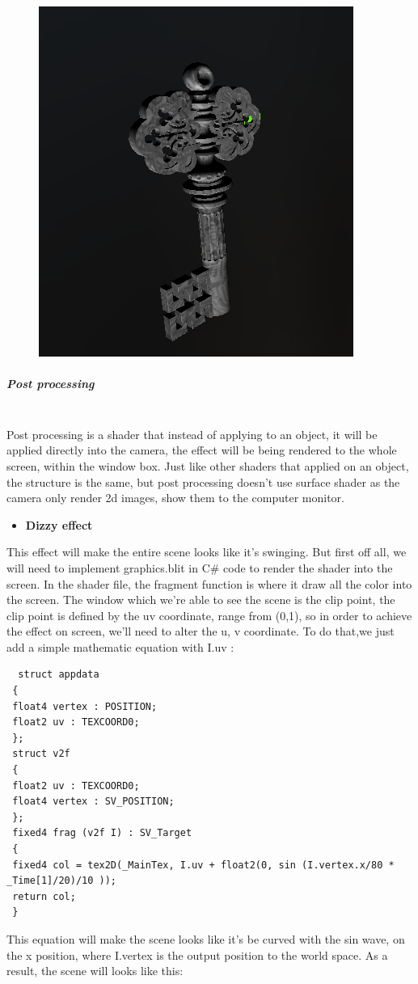 \documentclass[a4paper, 13pt]{extarticle}
\begin{document}
{\begin{figure}[h]
			\begin{minipage}{1\textwidth}
				\centering
				\includegraphics[width=0.3\linewidth]{intructions/light_react.png}
				\centering
			\end{minipage}
	\end{figure}
\subparagraph{Post processing} ~\\
Post processing is a shader that instead of applying to an object, it will be applied directly into the camera, the effect will be being rendered to the whole screen, within the window box. Just like other shaders that applied on an object, the structure is the same, but post processing doesn't use surface shader as the camera only render 2d images, show them to the computer monitor.
\begin{itemize}
	\item \bfseries Dizzy effect 
\end{itemize} 
 This effect will make the entire scene looks like it's swinging. But first off all, we will need to implement graphics.blit in C\# code to render the shader into the screen. In the shader file, the fragment function is where it draw all the color into the screen. The window which we're able to see the scene is the clip point, the clip point is defined by the uv coordinate, range from (0,1), so in order to achieve the effect on screen, we'll need to alter the u, v coordinate. To do that,we just add a simple mathematic equation with I.uv : 
 \begin{lstlisting}
  struct appdata
 {
 float4 vertex : POSITION;
 float2 uv : TEXCOORD0;
 };
 struct v2f
 {
 float2 uv : TEXCOORD0;
 float4 vertex : SV_POSITION;
 };
 fixed4 frag (v2f I) : SV_Target
 {
 fixed4 col = tex2D(_MainTex, I.uv + float2(0, sin (I.vertex.x/80 * _Time[1]/20)/10 ));
 return col;
 }
 \end{lstlisting} 
 This equation will make the scene looks like it's be curved with the sin wave, on the x position, where I.vertex is the output position to the world space. As a result, the scene will looks like this: 
 \newpage
 ~
 \begin{figure}[h] 

\end{figure}}
\end{document}
